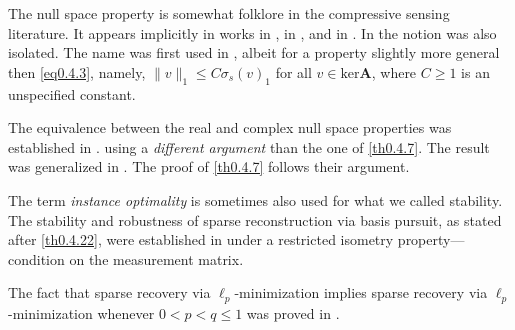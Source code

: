The null space property is somewhat folklore in the compressive sensing literature. It appears implicitly in works in \cite{Donoho2003}, in \cite{Donoho2001}, and in \cite{Elad2002}. In \cite{Gribonval2003} the notion was also isolated. The name was first used in \cite{Cohen2009}, albeit for a property slightly more general then \cref{eq0.4.3}, namely, $\|v\|_1 \leq C\sigma_s(v)_1$ for all $v \in \text{ker}\mathbf{A}$, where $C \geq 1$ is an unspecified constant. 

The equivalence between the real and complex null space properties was established in \cite{Foucart2010}. using a \emph{\textcolor[rgb]{1,0,0}{different argument}} than the one of \cref{th0.4.7}. The result was generalized in \cite{Lai2011}. The proof of \cref{th0.4.7} follows their argument.

The term \emph{\textcolor[rgb]{1,0,0}{instance optimality}} is sometimes also used for what we called stability. The stability and robustness of sparse reconstruction via basis pursuit, as stated after \cref{th0.4.22}, were established in \cite{Candes2006a} under a restricted isometry property---condition on the measurement matrix.

The fact that sparse recovery via $\ell_p$-minimization implies sparse recovery via $\ell_p$-minimization whenever $0<p<q\leq 1$ was proved in \cite{Gribonval2007}. 








